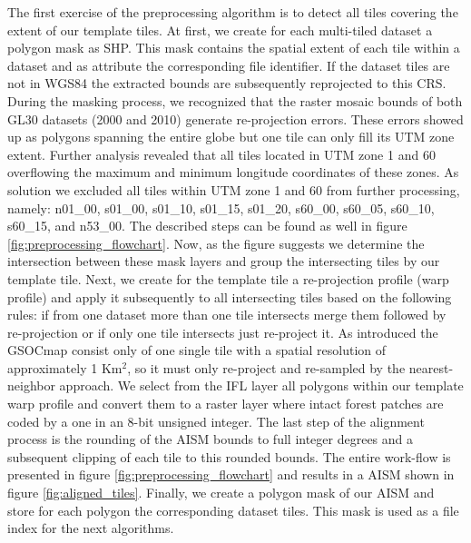 		The first exercise of the preprocessing algorithm is to detect all tiles covering the extent of our template tiles. At first, we create for each multi-tiled dataset a polygon mask as \ac{SHP}. This mask contains the spatial extent of each tile within a dataset and as attribute the corresponding file identifier. If the dataset tiles are not in \ac{WGS84} the extracted bounds are subsequently reprojected to this \ac{CRS}. During the masking process, we recognized that the raster mosaic bounds of both \ac{GL30} datasets (2000 and 2010) generate re-projection errors. These errors showed up as polygons spanning the entire globe but one tile can only fill its \ac{UTM} zone extent. Further analysis revealed that all tiles located in \ac{UTM} zone 1 and 60 overflowing the maximum and minimum longitude coordinates of these zones. As solution we excluded all tiles within \ac{UTM} zone 1 and 60 from further processing, namely: n01\_00, s01\_00, s01\_10, s01\_15, s01\_20, s60\_00, s60\_05, s60\_10, s60\_15, and n53\_00. The described steps can be found as well in figure \ref{fig:preprocessing_flowchart}. Now, as the figure suggests we determine the intersection between these mask layers and group the intersecting tiles by our template tile. Next, we create for the template tile a re-projection profile (warp profile) and apply it subsequently to all intersecting tiles based on the following rules: if from one dataset more than one tile intersects merge them followed by re-projection or if only one tile intersects just re-project it. As introduced the \ac{GSOCmap} consist only of one single tile with a spatial resolution of approximately 1 Km$^2$, so it must only re-project and re-sampled by the nearest-neighbor approach. We select from the \ac{IFL} layer all polygons within our template warp profile and convert them to a raster layer where intact forest patches are coded by a one in an 8-bit unsigned integer. The last step of the alignment process is the rounding of the \ac{AISM} bounds to full integer degrees and a subsequent clipping of each tile to this rounded bounds. The entire work-flow is presented in figure \ref{fig:preprocessing_flowchart} and results in a \ac{AISM} shown in figure \ref{fig:aligned_tiles}. Finally, we create a polygon mask of our \ac{AISM} and store for each polygon the corresponding dataset tiles. This mask is used as a file index for the next algorithms.
